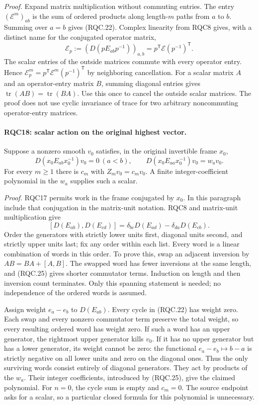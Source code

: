 \emph{Proof.}
Expand matrix multiplication without commuting entries.
The entry \((\mathcal E^m)_{ab}\) is the sum of ordered products
along length-\(m\) paths from \(a\) to \(b\).  Summing over
\(a=b\) gives (RQC.22).
Complex linearity from RQC8 gives, with a distinct name for the
conjugated operator matrix,
\[
 \mathcal E_p:=(D(pE_{ab}p^{-1}))_{a,b}
    =p^{\mathsf T}\mathcal E(p^{-1})^{\mathsf T}.
 \tag{RQC.23}
\]
The scalar entries of the outside matrices commute with every
operator entry.  Hence
\(\mathcal E_p^m=p^{\mathsf T}\mathcal E^m(p^{-1})^{\mathsf T}\)
by neighboring cancellation.
For a scalar matrix \(A\) and an operator-entry matrix \(B\),
summing diagonal entries gives
\(\operatorname{tr}(AB)=\operatorname{tr}(BA)\).
Use this once to cancel the outside scalar matrices.
The proof does not use cyclic invariance of trace for two
arbitrary noncommuting operator-entry matrices.

\paragraph{RQC18: scalar action on the original highest vector.}
\label{claim:RQC18}
Suppose a nonzero smooth \(v_0\) satisfies, in the original
invertible frame \(x_0\),
\[
 D(x_0E_{ab}x_0^{-1})v_0=0\ (a<b),\qquad
 D(x_0E_{aa}x_0^{-1})v_0=w_av_0.
 \tag{RQC.24}
\]
For every \(m\ge1\) there is \(c_m\) with \(Z_mv_0=c_mv_0\).
A finite integer-coefficient polynomial in the \(w_a\) supplies
such a scalar.

\emph{Proof.}
RQC17 permits work in the frame conjugated by \(x_0\).
In this paragraph include that conjugation in the matrix-unit
notation.  RQC8 and matrix-unit multiplication give
\[
 [D(E_{ab}),D(E_{cd})]
   =\delta_{bc}D(E_{ad})-\delta_{da}D(E_{cb}).
 \tag{RQC.25}
\]
Order the generators with strictly lower units first, diagonal
units second, and strictly upper units last; fix any order within
each list.  Every word is a linear combination of words in this
order.  To prove this, swap an adjacent inversion by
\(AB=BA+[A,B]\).  The swapped word has fewer inversions at the
same length, and (RQC.25) gives shorter commutator terms.
Induction on length and then inversion count terminates.
Only this spanning statement is needed; no independence of the
ordered words is assumed.

Assign weight \(e_a-e_b\) to \(D(E_{ab})\).
Every cycle in (RQC.22) has weight zero.  Each swap and every
nonzero commutator term preserve the total weight, so every
resulting ordered word has weight zero.
If such a word has an upper generator, the rightmost upper
generator kills \(v_0\).
If it has no upper generator but has a lower generator, its weight
cannot be zero: the functional
\(e_a-e_b\mapsto b-a\) is strictly negative on all lower units
and zero on the diagonal ones.
Thus the only surviving words consist entirely of diagonal
generators.  They act by products of the \(w_a\).
Their integer coefficients, introduced by (RQC.25), give the
claimed polynomial.  For \(n=0\), the cycle sum is empty and
\(c_m=0\).  The source endpoint asks for a scalar, so a particular
closed formula for this polynomial is unnecessary.

